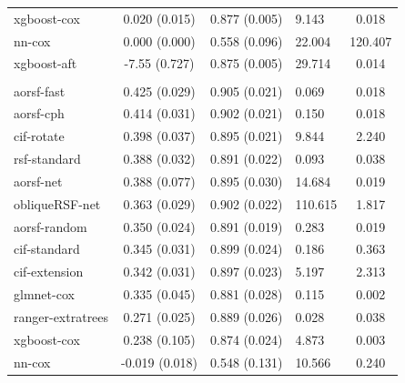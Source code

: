 \documentclass[twoside,11pt]{article}\usepackage[]{graphicx}\usepackage[]{xcolor}
\newenvironment{knitrout}{}{} %
\begin{document}
\begin{knitrout}
\begin{longtable}[t]{lcclc}
\hspace{1em}xgboost-cox & 0.020 (0.015) & 0.877 (0.005) & 9.143 & 0.018\\
\hspace{1em}nn-cox & 0.000 (0.000) & 0.558 (0.096) & 22.004 & 120.407\\
\hspace{1em}xgboost-aft & -7.55 (0.727) & 0.875 (0.005) & 29.714 & 0.014\\
\addlinespace[0.3em]
\hline
\multicolumn{5}{l}{\textit{\textbf{Primary biliary cholangitis; death, n = 276, p = 19}}}\\
\hline
\hspace{1em}aorsf-fast & 0.425 (0.029) & 0.905 (0.021) & 0.069 & 0.018\\
\hspace{1em}aorsf-cph & 0.414 (0.031) & 0.902 (0.021) & 0.150 & 0.018\\
\hspace{1em}cif-rotate & 0.398 (0.037) & 0.895 (0.021) & 9.844 & 2.240\\
\hspace{1em}rsf-standard & 0.388 (0.032) & 0.891 (0.022) & 0.093 & 0.038\\
\hspace{1em}aorsf-net & 0.388 (0.077) & 0.895 (0.030) & 14.684 & 0.019\\
\hspace{1em}obliqueRSF-net & 0.363 (0.029) & 0.902 (0.022) & 110.615 & 1.817\\
\hspace{1em}aorsf-random & 0.350 (0.024) & 0.891 (0.019) & 0.283 & 0.019\\
\hspace{1em}cif-standard & 0.345 (0.031) & 0.899 (0.024) & 0.186 & 0.363\\
\hspace{1em}cif-extension & 0.342 (0.031) & 0.897 (0.023) & 5.197 & 2.313\\
\hspace{1em}glmnet-cox & 0.335 (0.045) & 0.881 (0.028) & 0.115 & 0.002\\
\hspace{1em}ranger-extratrees & 0.271 (0.025) & 0.889 (0.026) & 0.028 & 0.038\\
\hspace{1em}xgboost-cox & 0.238 (0.105) & 0.874 (0.024) & 4.873 & 0.003\\
\hspace{1em}nn-cox & -0.019 (0.018) & 0.548 (0.131) & 10.566 & 0.240\\

\end{longtable}
\end{knitrout}
\end{document}
